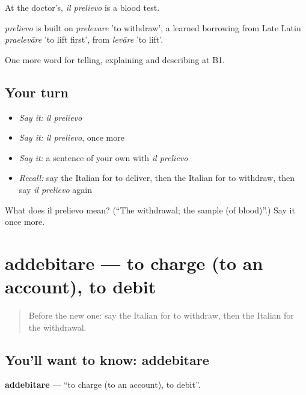 At the doctor's, \emph{il prelievo} is a blood test.

\begin{cousinweb}
\emph{prelievo} is built on \emph{prelevare} 'to withdraw', a learned borrowing from Late Latin \emph{praelevāre} 'to lift first', from \emph{levāre} 'to lift'.
\end{cousinweb}

\begin{grammarlens}[title={What you've built}]
One more word for telling, explaining and describing at B1.
\end{grammarlens}

\subsection*{Your turn}
\begin{itemize}
\raggedright
  \item \emph{Say it:} \emph{il prelievo}
  \item \emph{Say it:} \emph{il prelievo}, once more
  \item \emph{Say it:} a sentence of your own with \emph{il prelievo}
  \item \emph{Recall:} say the Italian for to deliver, then the Italian for to withdraw, then say \emph{il prelievo} again
\end{itemize}

\begin{tcolorbox}[breakable,colback=teal!4,colframe=teal!35!black,title={Before you move on}]
What does il prelievo mean? (\textquotedblleft{}The withdrawal; the sample (of blood)\textquotedblright{}.) Say it once more.
\end{tcolorbox}
\section[addebitare]{addebitare — to charge (to an account), to debit}

\label{lesson:IT-C459-addebitare}



\begin{quote}
Before the new one: say the Italian for to withdraw, then the Italian for the withdrawal.
\end{quote}

\subsection*{You'll want to know: addebitare}
\textbf{addebitare} — \textquotedblleft{}to charge (to an account), to debit\textquotedblright{}.

